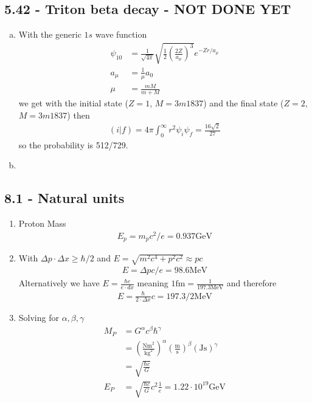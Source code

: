 \documentclass[../main.tex]{subfiles}
\begin{document}
\subsection{5.42 - Triton beta decay - NOT DONE YET}
\begin{enumerate}[a.]
\item With the generic $1s$ wave function
\begin{align}
\psi_{10}&=\frac{1}{\sqrt{4\pi}}\sqrt{\frac{1}{2}\left(\frac{2Z}{a_\mu}\right)^3}e^{-Zr/a_\mu}\\
a_\mu&=\frac{1}{\mu}a_0\\
\mu&=\frac{mM}{m+M}
\end{align}
we get with the initial state ($Z=1$, $M=3m 1837$) and the final state ($Z=2$, $M=3m 1837$) then
\begin{align}
\left(i|f\right)=4\pi\int_0^\infty r^2\psi_i\psi_f=\frac{16\sqrt{2}}{27}
\end{align}
so the probability is 512/729.
\item
\end{enumerate}



\subsection{8.1 - Natural units}
\begin{enumerate}
\item Proton Mass
\begin{align}
      E_p=m_pc^2/e=0.937\text{GeV}
\end{align}
\item With $\Delta p\cdot\Delta x\ge\hbar/2$ and $E=\sqrt{m^2c^4+p^2c^2}\approx pc$
\begin{align}
	E=\Delta p c/e=98.6\text{MeV}
\end{align}
Alternatively we have $E=\frac{\hbar c}{e\cdot dx}$ meaning $1\text{fm}=\frac{1}{197.3\text{MeV}}$ and therefore
\begin{align}
	E=\frac{\hbar}{2\cdot\Delta x}c=197.3/2\text{MeV}
\end{align}
\item Solving for $\alpha,\beta,\gamma$
\begin{align}
	M_P
	&=G^\alpha c^\beta \hbar^\gamma\\
	&=\left(\frac{\text{Nm}^2}{\text{kg}^2}\right)^\alpha\left(\frac{\text{m}}{\text{s}}\right)^\beta\left(\text{Js}\right)^\gamma\\
	&=\sqrt{\frac{\hbar c}{G}}\\
	E_P&=\sqrt{\frac{\hbar c}{G}}c^2\frac{1}{e}=1.22\cdot10^{19}\text{GeV}
\end{align}
\end{enumerate}
\end{document}
